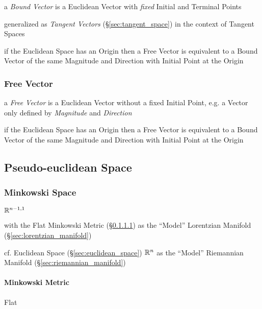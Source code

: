 a \emph{Bound Vector} is a Euclidean Vector with \emph{fixed} Initial and
Terminal Points

generalized as \emph{Tangent Vectors} (\S\ref{sec:tangent_space}) in the
context of Tangent Spaces

if the Euclidean Space has an Origin then a Free Vector is equivalent to a
Bound Vector of the same Magnitude and Direction with Initial Point at the
Origin



\subsubsection{Free Vector}\label{sec:free_vector}

a \emph{Free Vector} is a Euclidean Vector without a fixed Initial Point, e.g.
a Vector only defined by \emph{Magnitude} and \emph{Direction}

if the Euclidean Space has an Origin then a Free Vector is equivalent to a
Bound Vector of the same Magnitude and Direction with Initial Point at the
Origin



\subsection{Pseudo-euclidean Space}\label{sec:pseudo_euclidean}

\subsubsection{Minkowski Space}\label{sec:minkowski_space}

$\mathbb{R}^{n-1,1}$

with the Flat Minkowski Metric (\S\ref{sec:minkowski_metric}) as the
``Model'' Lorentzian Manifold (\S\ref{sec:lorentzian_manifold})

cf. Euclidean Space (\S\ref{sec:euclidean_space}) $\mathbb{R}^n$ as the
``Model'' Riemannian Manifold (\S\ref{sec:riemannian_manifold})



\paragraph{Minkowski Metric}\label{sec:minkowski_metric}\hfill

Flat

